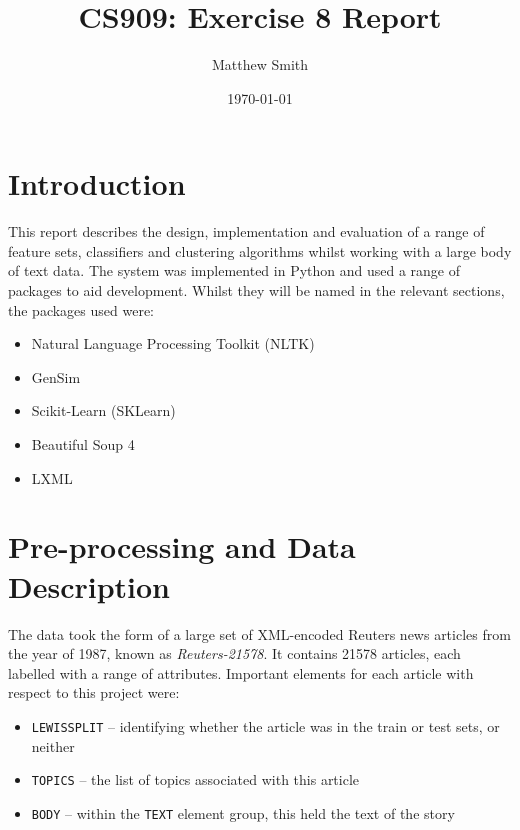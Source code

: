 \documentclass[11pt]{article}
\author{Matthew Smith}
\title{CS909: Exercise 8 Report}
\date{\today}
\begin{document}
\maketitle

\section{Introduction}
This report describes the design, implementation and evaluation of a range of feature sets, classifiers and clustering algorithms whilst working with a large body of text data. The system was implemented in Python and used a range of packages to aid development. Whilst they will be named in the relevant sections, the packages used were:
\begin{itemize}
\item Natural Language Processing Toolkit (NLTK)~\cite{nltk}
\item GenSim~\cite{gensim}
\item Scikit-Learn (SKLearn)~\cite{scikit-learn}
\item Beautiful Soup 4~\cite{bs4}
\item LXML~\cite{lxml}
\end{itemize}

\section{Pre-processing and Data Description}
\label{preproc}
The data took the form of a large set of XML-encoded Reuters news articles from the year of 1987, known as \emph{Reuters-21578}.  It contains 21578 articles, each labelled with a range of attributes. Important elements for each article with respect to this project were:
\begin{itemize}
\item \texttt{LEWISSPLIT} – identifying whether the article was in the train or test sets, or neither
\item \texttt{TOPICS} – the list of topics associated with this article
\item \texttt{BODY} – within the \texttt{TEXT} element group, this held the text of the story
\end{itemize}
\end{document}
